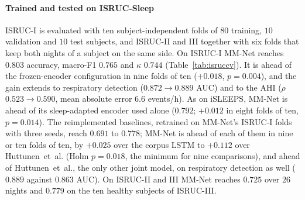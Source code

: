 \documentclass[a4paper,fleqn]{cas-sc}
\begin{document}
\paragraph{Trained and tested on ISRUC-Sleep} ISRUC-I is evaluated with ten
subject-independent folds of $80$ training, $10$ validation and $10$ test subjects, and
ISRUC-II and III together with six folds that keep both nights of a subject on the same side.
On ISRUC-I MM-Net reaches $0.803$ accuracy, macro-F1 $0.765$ and $\kappa$ $0.744$
(Table~\ref{tab:isruccv}). It is ahead of the frozen-encoder configuration in nine folds of ten
($+0.018$, $p=0.004$), and the gain extends to respiratory detection
($0.872\rightarrow0.889$ AUC) and to the AHI ($\rho$ $0.523\rightarrow0.590$, mean absolute error
$6.6$ events/h). As on iSLEEPS, MM-Net is ahead of its sleep-adapted encoder used alone ($0.792$;
$+0.012$ in eight folds of ten, $p=0.014$). The reimplemented baselines, retrained on MM-Net's
ISRUC-I folds with three seeds, reach $0.691$ to $0.778$; MM-Net is ahead of each of them in nine
or ten folds of ten, by $+0.025$ over the corpus LSTM to $+0.112$ over Huttunen~et~al. (Holm
$p=0.018$, the minimum for nine comparisons), and ahead of Huttunen~et~al., the only other joint
model, on respiratory detection as well ($0.889$ against $0.863$ AUC). On ISRUC-II and III MM-Net
reaches $0.725$ over $26$ nights and $0.779$ on the ten healthy subjects of ISRUC-III.
\end{document}
